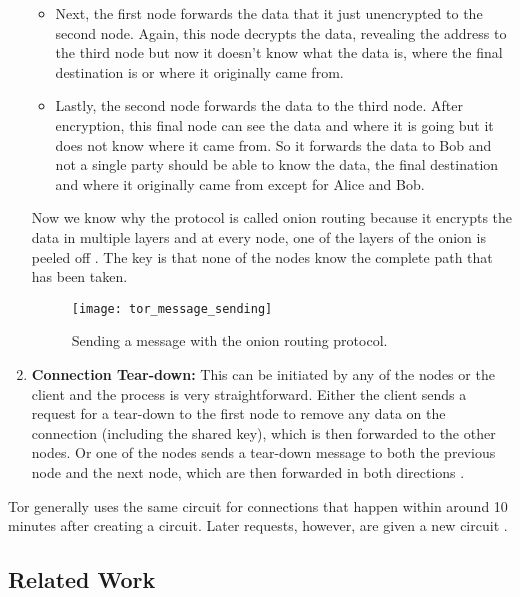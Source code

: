 \begin{enumerate}
\begin{itemize}
      \item Next, the first node forwards the data that it just unencrypted to the second node. Again, this node decrypts the data, revealing the address to the third node
        but now it doesn't know what the data is, where the final destination is or where it originally came from.

      \item Lastly, the second node forwards the data to the third node. After encryption, this final node can see the data and where it is going but it does not know where it came from.
        So it forwards the data to Bob and not a single party should be able to know the data, the final destination and where it originally came from except for Alice and Bob.
    \end{itemize}

    Now we know why the protocol is called onion routing because it encrypts the data in multiple layers and at every node, one of the layers of the onion is peeled off \cite{tor_project2}.
    The key is that none of the nodes know the complete path that has been taken.

    \begin{figure}[h]
      \centering
      \texttt{[image: tor\_message\_sending]}
      \caption{Sending a message with the onion routing protocol.}
      \label{fig:tor_message_sending}
    \end{figure}

  \item \textbf{Connection Tear-down:} This can be initiated by any of the nodes or the client and the process is very straightforward.
    Either the client sends a request for a tear-down to the first node to remove any data on the connection (including the shared key), which is then forwarded to the other nodes.
    Or one of the nodes sends a tear-down message to both the previous node and the next node, which are then forwarded in both directions \cite{goldschlag1999onion}.

\end{enumerate}

Tor generally uses the same circuit for connections that happen within around 10 minutes after creating a circuit.
Later requests, however, are given a new circuit \cite{tor_project, tor_project2}.

\subsection{Related Work}

